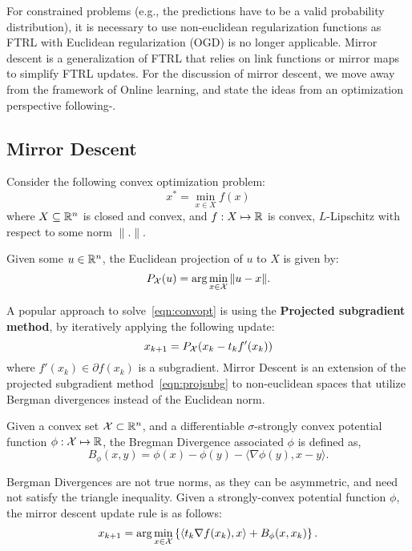 For constrained problems (e.g., the predictions have to be a valid probability distribution), it is
necessary to use non-euclidean regularization functions as FTRL with Euclidean regularization (OGD)
is no longer applicable.
Mirror descent is a generalization of FTRL that relies on link functions or mirror maps to simplify
FTRL updates.
For the discussion of mirror descent, we move away from the framework of Online learning, and state
the ideas from an optimization perspective following-\cite{beckMirror2003a,beckFirstOrder2017}.

\subsection{Mirror Descent}
Consider the following convex optimization problem:
\begin{equation}
	\label{eqn:convopt} x^{\ast} =
	\min_{x \in X} f(x)
\end{equation} where $X \subseteq \mathbb{R}^n$ is closed and convex, and $f: X \mapsto
	\mathbb{R}$ is convex, $L$-Lipschitz with respect to some norm $\|.
	\|$.

Given some $u \in \mathbb{R}^n$, the Euclidean projection of $u$ to $X$ is given by:
\begin{equation}
	\label{eqn:eucproj} P_{\mathcal{X}}(u) = \arg \min_{x \in \mathcal{X}} \| u - x \|.
\end{equation}

A popular approach to solve~\ref{eqn:convopt} is using the \textbf{Projected subgradient method},
by iteratively applying the following update:
\begin{equation}
	\label{eqn:projsubg} x_{k+1} =
	P_{\mathcal{X}}(x_k - t_k f'(x_k))
\end{equation} where $f'(x_k) \in \partial f(x_k)$ is a subgradient.
Mirror Descent is an extension of the projected subgradient method~\ref{eqn:projsubg} to
non-euclidean spaces that utilize Bergman divergences instead of the Euclidean norm.

\begin{definition}
	\label{def:bregman}
	Given a convex set $\mathcal{X} \subset \mathbb{R}^n$, and a differentiable $\sigma$-strongly convex potential
	function $\phi: \mathcal{X} \mapsto \mathbb{R}$, the Bregman Divergence associated $\phi$ is defined as, $$
		B_\phi(x, y) = \phi(x) - \phi(y) - \langle \nabla \phi(y), x-y \rangle.
	$$
\end{definition}

Bergman Divergences are not true norms, as they can be asymmetric, and need not satisfy the
triangle inequality.
Given a strongly-convex potential function $\phi$, the mirror descent update rule is as follows:
\begin{equation}
	x_{k+1} = \arg \min_{x \in \mathcal{X}} \left \{ \left \langle t_k \nabla f(x_k), x
	\right \rangle + B_\phi(x, x_k) \right \}.
\end{equation}


